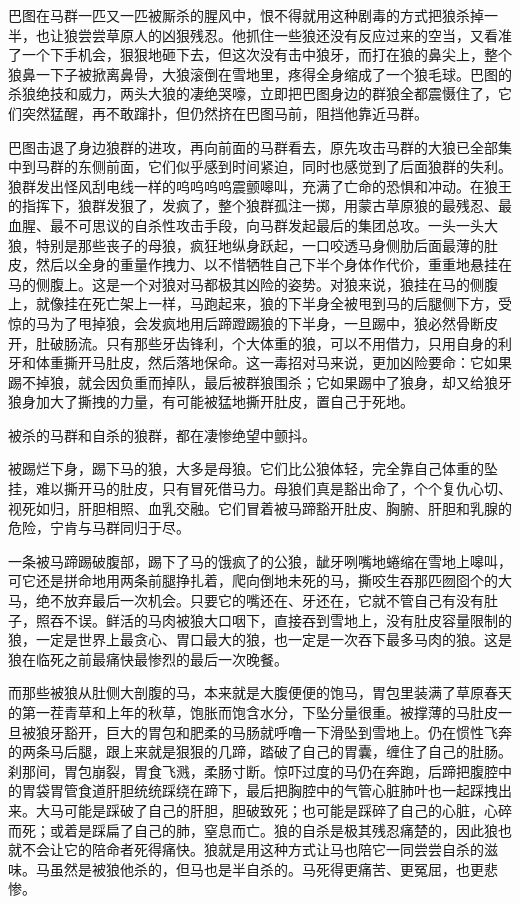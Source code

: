 \par 巴图在马群一匹又一匹被厮杀的腥风中，恨不得就用这种剧毒的方式把狼杀掉一半，也让狼尝尝草原人的凶狠残忍。他抓住一些狼还没有反应过来的空当，又看准了一个下手机会，狠狠地砸下去，但这次没有击中狼牙，而打在狼的鼻尖上，整个狼鼻一下子被掀离鼻骨，大狼滚倒在雪地里，疼得全身缩成了一个狼毛球。巴图的杀狼绝技和威力，两头大狼的凄绝哭嚎，立即把巴图身边的群狼全都震慑住了，它们突然猛醒，再不敢蹿扑，但仍然挤在巴图马前，阻挡他靠近马群。
\par 巴图击退了身边狼群的进攻，再向前面的马群看去，原先攻击马群的大狼已全部集中到马群的东侧前面，它们似乎感到时间紧迫，同时也感觉到了后面狼群的失利。狼群发出怪风刮电线一样的呜呜呜呜震颤嗥叫，充满了亡命的恐惧和冲动。在狼王的指挥下，狼群发狠了，发疯了，整个狼群孤注一掷，用蒙古草原狼的最残忍、最血腥、最不可思议的自杀性攻击手段，向马群发起最后的集团总攻。一头一头大狼，特别是那些丧子的母狼，疯狂地纵身跃起，一口咬透马身侧肋后面最薄的肚皮，然后以全身的重量作拽力、以不惜牺牲自己下半个身体作代价，重重地悬挂在马的侧腹上。这是一个对狼对马都极其凶险的姿势。对狼来说，狼挂在马的侧腹上，就像挂在死亡架上一样，马跑起来，狼的下半身全被甩到马的后腿侧下方，受惊的马为了甩掉狼，会发疯地用后蹄蹬踢狼的下半身，一旦踢中，狼必然骨断皮开，肚破肠流。只有那些牙齿锋利，个大体重的狼，可以不用借力，只用自身的利牙和体重撕开马肚皮，然后落地保命。这一毒招对马来说，更加凶险要命：它如果踢不掉狼，就会因负重而掉队，最后被群狼围杀；它如果踢中了狼身，却又给狼牙狼身加大了撕拽的力量，有可能被猛地撕开肚皮，置自己于死地。
\par 被杀的马群和自杀的狼群，都在凄惨绝望中颤抖。
\par 被踢烂下身，踢下马的狼，大多是母狼。它们比公狼体轻，完全靠自己体重的坠挂，难以撕开马的肚皮，只有冒死借马力。母狼们真是豁出命了，个个复仇心切、视死如归，肝胆相照、血乳交融。它们冒着被马蹄豁开肚皮、胸腑、肝胆和乳腺的危险，宁肯与马群同归于尽。
\par 一条被马蹄踢破腹部，踢下了马的饿疯了的公狼，龇牙咧嘴地蜷缩在雪地上嗥叫，可它还是拼命地用两条前腿挣扎着，爬向倒地未死的马，撕咬生吞那匹囫囵个的大马，绝不放弃最后一次机会。只要它的嘴还在、牙还在，它就不管自己有没有肚子，照吞不误。鲜活的马肉被狼大口咽下，直接吞到雪地上，没有肚皮容量限制的狼，一定是世界上最贪心、胃口最大的狼，也一定是一次吞下最多马肉的狼。这是狼在临死之前最痛快最惨烈的最后一次晚餐。
\par 而那些被狼从肚侧大剖腹的马，本来就是大腹便便的饱马，胃包里装满了草原春天的第一茬青草和上年的秋草，饱胀而饱含水分，下坠分量很重。被撑薄的马肚皮一旦被狼牙豁开，巨大的胃包和肥柔的马肠就呼噜一下滑坠到雪地上。仍在惯性飞奔的两条马后腿，跟上来就是狠狠的几蹄，踏破了自己的胃囊，缠住了自己的肚肠。刹那间，胃包崩裂，胃食飞溅，柔肠寸断。惊吓过度的马仍在奔跑，后蹄把腹腔中的胃袋胃管食道肝胆统统踩绕在蹄下，最后把胸腔中的气管心脏肺叶也一起踩拽出来。大马可能是踩破了自己的肝胆，胆破致死；也可能是踩碎了自己的心脏，心碎而死；或着是踩扁了自己的肺，窒息而亡。狼的自杀是极其残忍痛楚的，因此狼也就不会让它的陪命者死得痛快。狼就是用这种方式让马也陪它一同尝尝自杀的滋味。马虽然是被狼他杀的，但马也是半自杀的。马死得更痛苦、更冤屈，也更悲惨。
